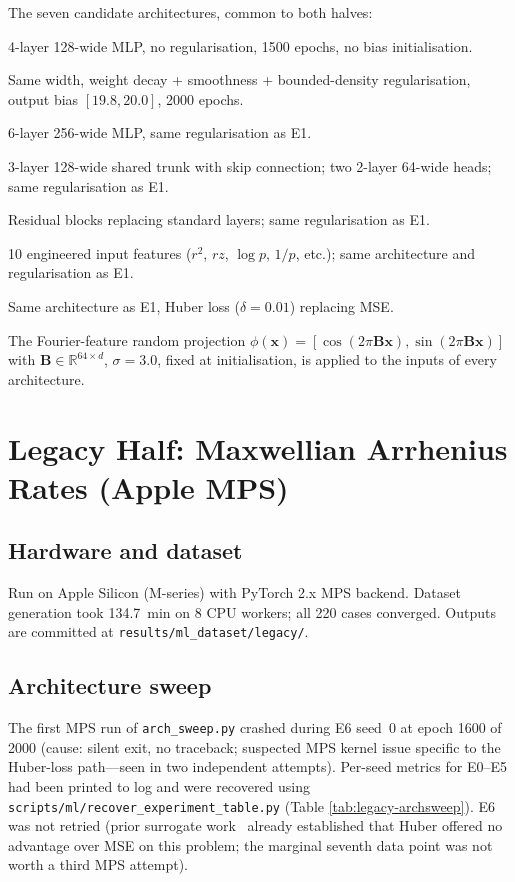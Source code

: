 \documentclass[11pt,a4paper]{article}
\begin{document}
The seven candidate architectures, common to both halves:
\begin{description}[itemsep=1pt,topsep=2pt]
  \item[E0 -- Baseline:] 4-layer 128-wide MLP, no regularisation,
        1500 epochs, no bias initialisation.
  \item[E1 -- v4 recipe:] Same width, weight decay + smoothness +
        bounded-density regularisation, output bias $[19.8, 20.0]$,
        2000 epochs.
  \item[E2 -- Wider/deeper:] 6-layer 256-wide MLP, same regularisation
        as E1.
  \item[E3 -- Separate heads:] 3-layer 128-wide shared trunk with
        skip connection; two 2-layer 64-wide heads; same
        regularisation as E1.
  \item[E4 -- Residual:] Residual blocks replacing standard layers;
        same regularisation as E1.
  \item[E5 -- Enhanced features:] 10 engineered input features
        ($r^2$, $rz$, $\log p$, $1/p$, etc.); same architecture
        and regularisation as E1.
  \item[E6 -- Huber loss:] Same architecture as E1, Huber loss
        ($\delta=0.01$) replacing MSE.
\end{description}

The Fourier-feature random projection
$\phi(\mathbf{x}) = [\cos(2\pi\mathbf{Bx}), \sin(2\pi\mathbf{Bx})]$
with $\mathbf{B}\in\mathbb{R}^{64\times d}$, $\sigma=3.0$, fixed at
initialisation, is applied to the inputs of every architecture.

\section{Legacy Half: Maxwellian Arrhenius Rates (Apple MPS)}
\label{sec:legacy}

\subsection{Hardware and dataset}
Run on Apple Silicon (M-series) with PyTorch 2.x MPS backend.
Dataset generation took \SI{134.7}{\minute} on 8 CPU workers; all
220 cases converged.  Outputs are committed at
\texttt{results/ml\_dataset/legacy/}.

\subsection{Architecture sweep}
The first MPS run of \texttt{arch\_sweep.py} crashed during E6 seed~0
at epoch 1600 of 2000 (cause: silent exit, no traceback; suspected
MPS kernel issue specific to the Huber-loss path---seen in two
independent attempts).  Per-seed metrics for E0--E5 had been printed
to log and were recovered using
\texttt{scripts/ml/recover\_experiment\_table.py} (Table
\ref{tab:legacy-archsweep}).  E6 was not retried (prior surrogate
work~\citep{ngan2026sf6} already established that Huber offered no
advantage over MSE on this problem; the marginal seventh data point
was not worth a third MPS attempt).
\end{document}
